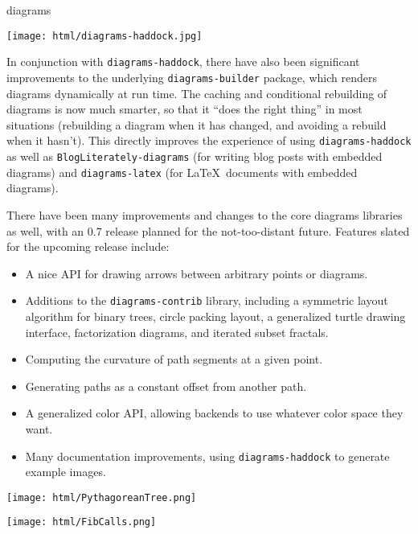 \begin{hcarentry}[updated]{diagrams}
\begin{center}
\texttt{[image: html/diagrams-haddock.jpg]}
\end{center}

In conjunction with \texttt{diagrams-haddock}, there have also been
significant improvements to the underlying \texttt{diagrams-builder}
package, which renders diagrams dynamically at run time.  The caching
and conditional rebuilding of diagrams is now much smarter, so that it
``does the right thing'' in most situations (rebuilding a diagram when
it has changed, and avoiding a rebuild when it hasn't).  This
directly improves the experience of using \texttt{diagrams-haddock} as
well as \texttt{BlogLiterately-diagrams} (for writing blog posts with
embedded diagrams) and \texttt{diagrams-latex} (for \LaTeX\ documents
with embedded diagrams).

There have been many improvements and changes to the core
diagrams libraries as well, with an 0.7 release planned for the
not-too-distant future. Features slated for the upcoming release
include:
\begin{itemize}
\item A nice API for drawing arrows between arbitrary points or diagrams.
\item Additions to the \texttt{diagrams-contrib} library, including a
  symmetric layout algorithm for binary trees, circle packing layout, a
  generalized turtle drawing interface, factorization diagrams, and
  iterated subset fractals.
\item Computing the curvature of path segments at a given point.
\item Generating paths as a constant offset from another path.
\item A generalized color API, allowing backends to use whatever color
  space they want.
\item Many documentation improvements, using \texttt{diagrams-haddock}
  to  generate example images.
\end{itemize}

\begin{center}
\texttt{[image: html/PythagoreanTree.png]}
\end{center}


\begin{center}
\texttt{[image: html/FibCalls.png]}
\end{center}


\end{hcarentry}
